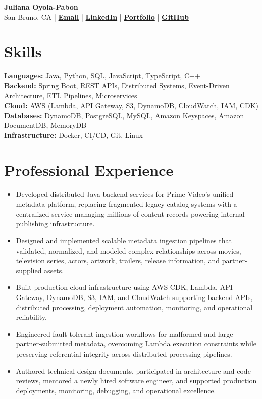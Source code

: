 \documentclass[10pt,letterpaper]{article}
\begin{document}
\begin{center}
{\LARGE\bfseries\color{Accent} Juliana Oyola-Pabon}\\[4pt]
San Bruno, CA
\;|\;
\href{mailto:julianaaoyola@gmail.com}{\textbf{Email}}
\;|\;
\href{https://linkedin.com/in/julianaoyola}{\textbf{LinkedIn}}
\;|\;
\href{https://juliana-portfolio-two.vercel.app/}{\textbf{Portfolio}}
\;|\;
\href{https://github.com/julsoyola}{\textbf{GitHub}}
\end{center}

\section*{Skills}

\textbf{Languages:} Java, Python, SQL, JavaScript, TypeScript, C++ \\
\textbf{Backend:} Spring Boot, REST APIs, Distributed Systems, Event-Driven Architecture, ETL Pipelines, Microservices \\
\textbf{Cloud:} AWS (Lambda, API Gateway, S3, DynamoDB, CloudWatch, IAM, CDK) \\
\textbf{Databases:} DynamoDB, PostgreSQL, MySQL, Amazon Keyspaces, Amazon DocumentDB, MemoryDB \\
\textbf{Infrastructure:} Docker, CI/CD, Git, Linux

\section*{Professional Experience}


\begin{itemize}
\item Developed distributed Java backend services for Prime Video's unified metadata platform, replacing fragmented legacy catalog systems with a centralized service managing millions of content records powering internal publishing infrastructure.
\item Designed and implemented scalable metadata ingestion pipelines that validated, normalized, and modeled complex relationships across movies, television series, actors, artwork, trailers, release information, and partner-supplied assets.
\item Built production cloud infrastructure using AWS CDK, Lambda, API Gateway, DynamoDB, S3, IAM, and CloudWatch supporting backend APIs, distributed processing, deployment automation, monitoring, and operational reliability.
\item Engineered fault-tolerant ingestion workflows for malformed and large partner-submitted metadata, overcoming Lambda execution constraints while preserving referential integrity across distributed processing pipelines.
\item Authored technical design documents, participated in architecture and code reviews, mentored a newly hired software engineer, and supported production deployments, monitoring, debugging, and operational excellence.
\end{itemize}
\end{document}
